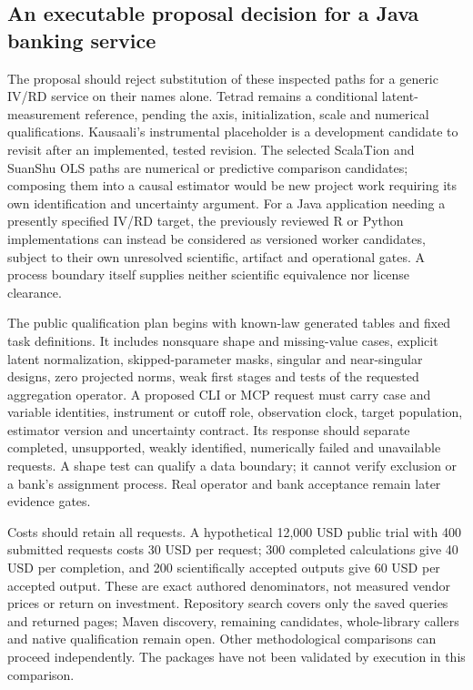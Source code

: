 \subsection{An executable proposal decision for a Java banking service}

The proposal should reject substitution of these inspected paths for a generic IV/RD service on their names alone. Tetrad remains a conditional latent-measurement reference, pending the axis, initialization, scale and numerical qualifications. Kausaali's instrumental placeholder is a development candidate to revisit after an implemented, tested revision. The selected ScalaTion and SuanShu OLS paths are numerical or predictive comparison candidates; composing them into a causal estimator would be new project work requiring its own identification and uncertainty argument. For a Java application needing a presently specified IV/RD target, the previously reviewed R or Python implementations can instead be considered as versioned worker candidates, subject to their own unresolved scientific, artifact and operational gates. A process boundary itself supplies neither scientific equivalence nor license clearance.~\citep{exec25_javaiv_choice,exec25_pyrdiv_choice}

The public qualification plan begins with known-law generated tables and fixed task definitions. It includes nonsquare shape and missing-value cases, explicit latent normalization, skipped-parameter masks, singular and near-singular designs, zero projected norms, weak first stages and tests of the requested aggregation operator. A proposed CLI or MCP request must carry case and variable identities, instrument or cutoff role, observation clock, target population, estimator version and uncertainty contract. Its response should separate completed, unsupported, weakly identified, numerically failed and unavailable requests. A shape test can qualify a data boundary; it cannot verify exclusion or a bank's assignment process. Real operator and bank acceptance remain later evidence gates.

Costs should retain all requests. A hypothetical 12,000 USD public trial with 400 submitted requests costs 30 USD per request; 300 completed calculations give 40 USD per completion, and 200 scientifically accepted outputs give 60 USD per accepted output. These are exact authored denominators, not measured vendor prices or return on investment. Repository search covers only the saved queries and returned pages; Maven discovery, remaining candidates, whole-library callers and native qualification remain open. Other methodological comparisons can proceed independently. The packages have not been validated by execution in this comparison.~\citep{exec25_javaiv_choice}
